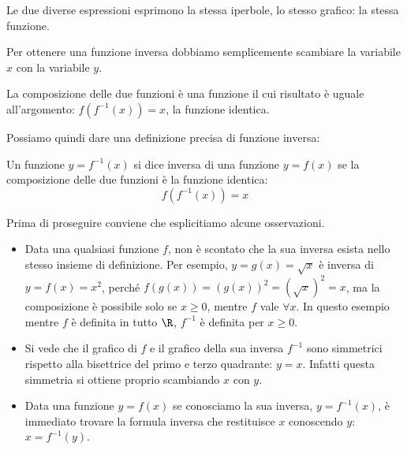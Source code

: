 Le due diverse espressioni esprimono la stessa iperbole, lo 
stesso grafico: la stessa funzione.

Per ottenere una funzione inversa dobbiamo semplicemente scambiare 
la variabile \(x\) con la variabile \(y\).



La composizione delle due funzioni è una funzione il cui 
risultato è uguale all'argomento: \(f(f^{-1}(x)) = x\), la funzione identica.

Possiamo quindi dare una definizione precisa di funzione inversa:

\begin{definizione}
Un funzione \(y=f^{-1}(x)\) si dice inversa di una funzione \(y=f(x)\) 
se la composizione delle due funzioni è la funzione identica:
\[f(f^{-1}(x))=x\]
\end{definizione}

Prima di proseguire conviene che esplicitiamo alcune osservazioni. 
\begin{itemize} [nosep]
\item 
Data una qualsiasi funzione \(f\), non è scontato che la sua inversa 
esista nello stesso insieme di definizione. 
Per esempio, 
\(y=g(x)=\sqrt{x}\) è inversa di \(y=f(x)=x^2\),  perché 
\(f(g(x))=(g(x))^2=(\sqrt{x})^2=x\), ma la composizione è possibile 
solo se \(x \ge 0\), mentre \(f\) vale \(\forall x\). 
In questo esempio mentre \(f\) è definita in tutto \(\R\), \(f^{-1}\)
è definita per \(x \geqslant 0\).
\item 
Si vede che il grafico di \(f\) e il grafico 
della sua inversa \(f^{-1}\) sono simmetrici rispetto alla bisettrice del 
primo e terzo quadrante: \(y=x\). Infatti questa simmetria si ottiene 
proprio scambiando \(x\) con \(y\). 
\item 
Data una funzione \(y = f(x)\) se conosciamo la sua inversa, 
\(y = f^{-1}(x)\), è immediato trovare la formula inversa che restituisce 
\(x\) conoscendo \(y\): \(x = f^{-1}(y)\).
\end{itemize}


